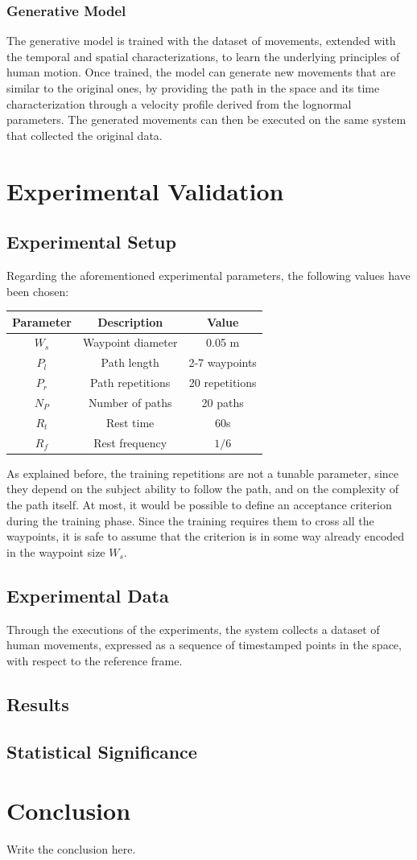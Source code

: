 \documentclass[12pt]{report}
\begin{document}
\subsection{Generative Model}
The generative model is trained with the dataset of movements, extended with the temporal and spatial characterizations, to learn the underlying principles of human motion. Once trained, the model can generate new movements that are similar to the original ones, by providing the path in the space and its time characterization through a velocity profile derived from the lognormal parameters. The generated movements can then be executed on the same system that collected the original data.
\chapter{Experimental Validation}
\section{Experimental Setup}
Regarding the aforementioned experimental parameters, the following values have been chosen: 

\begin{table}[h!]
    \centering
    \begin{tabular}{|ccc|}
    \hline
    \textbf{Parameter} & \textbf{Description} & \textbf{Value} \\
    \hline
    \hline
    $W_s$ & Waypoint diameter & 0.05 m \\
    $P_l$ & Path length & 2-7 waypoints \\
    $P_r$ & Path repetitions & 20 repetitions \\
    $N_P$ & Number of paths & 20 paths \\
    $R_t$ & Rest time & 60s \\
    $R_f$ & Rest frequency & $1/6$ \\
    \hline
\end{tabular}
\end{table}
As explained before, the training repetitions are not a tunable parameter, since they depend on the subject ability to follow the path, and on the complexity of the path itself. At most, it would be possible to define an acceptance criterion during the training phase. Since the training requires them to cross all the waypoints, it is safe to assume that the criterion is in some way already encoded in the waypoint size $W_s$.
\section{Experimental Data}
Through the executions of the experiments, the system collects a dataset of human movements, expressed as a sequence of timestamped points in the space, with respect to the reference frame. 


\section{Results}

\section{Statistical Significance}
\chapter{Conclusion}
Write the conclusion here.
\printbibliography
\end{document}

